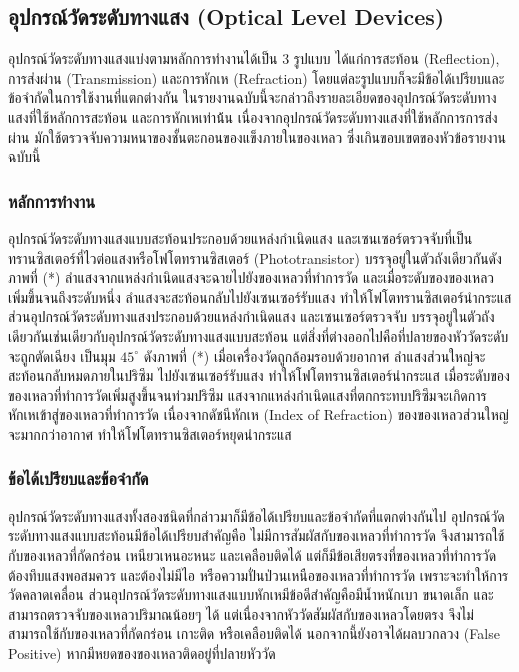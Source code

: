 \documentclass[final,11pt]{article}
\begin{document}
\subsection{อุปกรณ์วัดระดับทางแสง (Optical Level Devices)}
อุปกรณ์วัดระดับทางแสงแบ่งตามหลักการทำงานได้เป็น 3 รูปแบบ ได้แก่การสะท้อน (Reflection), การส่งผ่าน (Transmission) และการหักเห (Refraction) 
โดยแต่ละรูปแบบก็จะมีข้อได้เปรียบและข้อจำกัดในการใช้งานที่แตกต่างกัน ในรายงานฉบับนี้จะกล่าวถึงรายละเอียดของอุปกรณ์วัดระดับทางแสงที่ใช้หลักการสะท้อน 
และการหักเหเท่าน้้น เนื่องจากอุปกรณ์วัดระดับทางแสงที่ใช้หลักการการส่งผ่าน มักใช้ตรวจจับความหนาของชั้นตะกอนของแข็งภายในของเหลว 
ซึ่งเกินขอบเขตของหัวข้อรายงานฉบับนี้

\subsubsection{หลักการทำงาน}
อุปกรณ์วัดระดับทางแสงแบบสะท้อนประกอบด้วยแหล่งกำเนิดแสง และเซนเซอร์ตรวจจับที่เป็นทรานซิสเตอร์ที่ไวต่อแสงหรือโฟโตทรานซิสเตอร์ (Phototransistor) 
บรรจุอยู่ในตัวถังเดียวกันดังภาพที่ (*) ลำแสงจากแหล่งกำเนิดแสงจะฉายไปยังของเหลวที่ทำการวัด และเมื่อระดับของของเหลวเพิ่มขึ้นจนถึงระดับหนึ่ง 
ลำแสงจะสะท้อนกลับไปยังเซนเซอร์รับแสง ทำให้โฟโตทรานซิสเตอร์นำกระแส ส่วนอุปกรณ์วัดระดับทางแสงประกอบด้วยแหล่งกำเนิดแสง 
และเซนเซอร์ตรวจจับ บรรจุอยู่ในตัวถังเดียวกันเช่นเดียวกับอุปกรณ์วัดระดับทางแสงแบบสะท้อน แต่สิ่งที่ต่างออกไปคือที่ปลายของหัววัดระดับจะถูกตัดเฉียง
เป็นมุม $45^\circ$ ดังภาพที่ (*) เมื่อเครื่องวัดถูกล้อมรอบด้วยอากาศ ลำแสงส่วนใหญ่จะสะท้อนกลับหมดภายในปริซึม ไปยังเซนเซอร์รับแสง ทำให้โฟโตทรานซิสเตอร์นำกระแส
เมื่อระดับของของเหลวที่ทำการวัดเพิ่มสูงขึ้นจนท่วมปริซึม แสงจากแหล่งกำเนิดแสงที่ตกกระทบปริซึมจะเกิดการหักเหเข้าสู่ของเหลวที่ทำการวัด เนื่องจากดัชนีหักเห
(Index of Refraction) ของของเหลวส่วนใหญ่จะมากกว่าอากาศ ทำให้โฟโตทรานซิสเตอร์หยุดนำกระแส

\subsubsection{ข้อได้เปรียบและข้อจำกัด}
อุปกรณ์วัดระดับทางแสงทั้งสองชนิดที่กล่าวมาก็มีข้อได้เปรียบและข้อจำกัดที่แตกต่างกันไป อุปกรณ์วัดระดับทางแสงแบบสะท้อนมีข้อได้เปรียบสำคัญคือ
ไม่มีการสัมผัสกับของเหลวที่ทำการวัด จึงสามารถใช้กับของเหลวที่กัดกร่อน เหนียวเหนอะหนะ และเคลือบติดได้ แต่ก็มีข้อเสียตรงที่ของเหลวที่ทำการวัดต้องทึบแสงพอสมควร
และต้องไม่มีไอ หรือความปั่นป่วนเหนือของเหลวที่ทำการวัด เพราะจะทำให้การวัดคลาดเคลื่อน ส่วนอุปกรณ์วัดระดับทางแสงแบบหักเหมีข้อดีสำคัญคือมีน้ำหนักเบา ขนาดเล็ก
และสามารถตรวจจับของเหลวปริมาณน้อยๆ ได้ แต่เนื่องจากหัววัดสัมผัสกับของเหลวโดยตรง จึงไม่สามารถใช้กับของเหลวที่กัดกร่อน เกาะติด หรือเคลือบติดได้ 
นอกจากนี้ยังอาจได้ผลบวกลวง (False Positive) หากมีหยดของของเหลวติดอยู่ที่ปลายหัววัด
\end{document}
